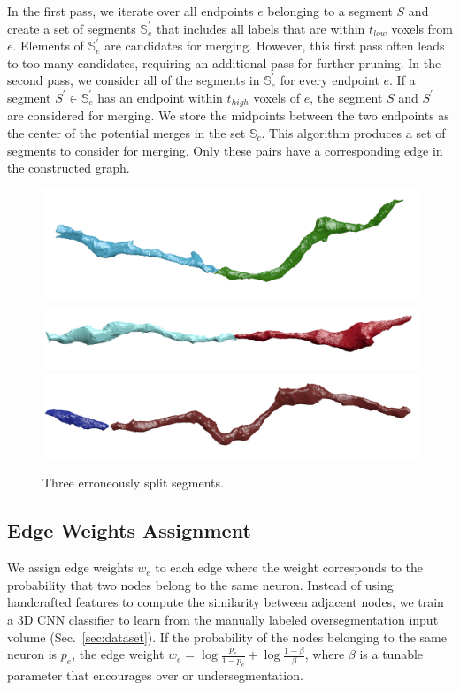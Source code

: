 In the first pass, we iterate over all endpoints $e$ belonging to a segment $S$ and create a set of segments $\mathbb{S}_e^\prime$ that includes all labels that are within $t_{low}$ voxels from $e$. Elements of $\mathbb{S}_e^\prime$ are candidates for merging. However, this first pass often leads to too many candidates, requiring an additional pass for further pruning. In the second pass, we consider all of the segments in $\mathbb{S}_e^\prime$ for every endpoint $e$. If a segment $S^\prime \in \mathbb{S}_e^\prime$ has an endpoint within $t_{high}$ voxels of $e$, the segment $S$ and $S^\prime$ are considered for merging. We store the midpoints between the two endpoints as the center of the potential merges in the set $\mathbb{S}_c$. This algorithm produces a set of segments to consider for merging. Only these pairs have a corresponding edge in the constructed graph.



\begin{figure}[t]
	\centering
	\includegraphics[width=0.92\linewidth]{./figures/split_error1.png}
	\includegraphics[width=0.92\linewidth]{./figures/split_error2.png}		\includegraphics[width=0.85\linewidth]{./figures/merge_candidate2.png}
	\caption{Three erroneously split segments.}
	\label{fig:merge_candidates}
\end{figure}

\subsection{Edge Weights Assignment}
We assign edge weights $w_e$ to each edge where the weight corresponds to the probability that two nodes belong to the same neuron.
Instead of using handcrafted features to compute the similarity between adjacent nodes, we train a 3D CNN classifier to learn from the manually labeled oversegmentation input volume (Sec.~\ref{sec:dataset}).
If the probability of the nodes belonging to the same neuron is $p_e$, the edge weight $w_e = \log{\frac{p_e}{1 - p_e}} + \log{\frac{1 - \beta}{\beta}}$, where $\beta$ is a tunable parameter that encourages over or undersegmentation.

